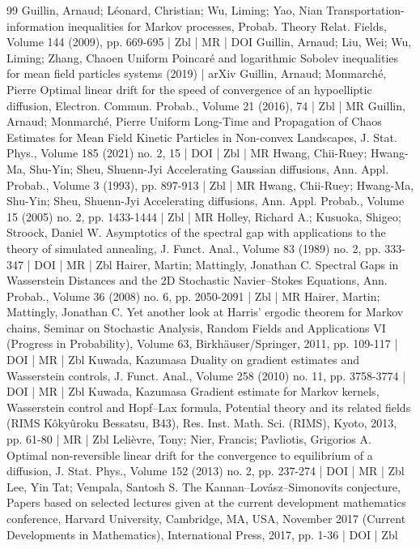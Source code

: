 \begin{thebibliography}{99}
 Guillin, Arnaud; Léonard, Christian; Wu, Liming; Yao, Nian Transportation-information inequalities for Markov processes, Probab. Theory Relat. Fields, Volume 144 (2009), pp. 669-695 | Zbl | MR | DOI
 Guillin, Arnaud; Liu, Wei; Wu, Liming; Zhang, Chaoen Uniform Poincaré and logarithmic Sobolev inequalities for mean field particles systems (2019) | arXiv
 Guillin, Arnaud; Monmarché, Pierre Optimal linear drift for the speed of convergence of an hypoelliptic diffusion, Electron. Commun. Probab., Volume 21 (2016), 74 | Zbl | MR
 Guillin, Arnaud; Monmarché, Pierre Uniform Long-Time and Propagation of Chaos Estimates for Mean Field Kinetic Particles in Non-convex Landscapes, J. Stat. Phys., Volume 185 (2021) no. 2, 15 | DOI | Zbl | MR
 Hwang, Chii-Ruey; Hwang-Ma, Shu-Yin; Sheu, Shuenn-Jyi Accelerating Gaussian diffusions, Ann. Appl. Probab., Volume 3 (1993), pp. 897-913 | Zbl | MR
 Hwang, Chii-Ruey; Hwang-Ma, Shu-Yin; Sheu, Shuenn-Jyi Accelerating diffusions, Ann. Appl. Probab., Volume 15 (2005) no. 2, pp. 1433-1444 | Zbl | MR
 Holley, Richard A.; Kusuoka, Shigeo; Stroock, Daniel W. Asymptotics of the spectral gap with applications to the theory of simulated annealing, J. Funct. Anal., Volume 83 (1989) no. 2, pp. 333-347 | DOI | MR | Zbl
 Hairer, Martin; Mattingly, Jonathan C. Spectral Gaps in Wasserstein Distances and the 2D Stochastic Navier–Stokes Equations, Ann. Probab., Volume 36 (2008) no. 6, pp. 2050-2091 | Zbl | MR
 Hairer, Martin; Mattingly, Jonathan C. Yet another look at Harris’ ergodic theorem for Markov chains, Seminar on Stochastic Analysis, Random Fields and Applications VI (Progress in Probability), Volume 63, Birkhäuser/Springer, 2011, pp. 109-117 | DOI | MR | Zbl
 Kuwada, Kazumasa Duality on gradient estimates and Wasserstein controls, J. Funct. Anal., Volume 258 (2010) no. 11, pp. 3758-3774 | DOI | MR | Zbl
 Kuwada, Kazumasa Gradient estimate for Markov kernels, Wasserstein control and Hopf–Lax formula, Potential theory and its related fields (RIMS Kôkyûroku Bessatsu, B43), Res. Inst. Math. Sci. (RIMS), Kyoto, 2013, pp. 61-80 | MR | Zbl
 Lelièvre, Tony; Nier, Francis; Pavliotis, Grigorios A. Optimal non-reversible linear drift for the convergence to equilibrium of a diffusion, J. Stat. Phys., Volume 152 (2013) no. 2, pp. 237-274 | DOI | MR | Zbl
 Lee, Yin Tat; Vempala, Santosh S. The Kannan–Lovász–Simonovits conjecture, Papers based on selected lectures given at the current development mathematics conference, Harvard University, Cambridge, MA, USA, November 2017 (Current Developments in Mathematics), International Press, 2017, pp. 1-36 | DOI | Zbl

\end{thebibliography}
